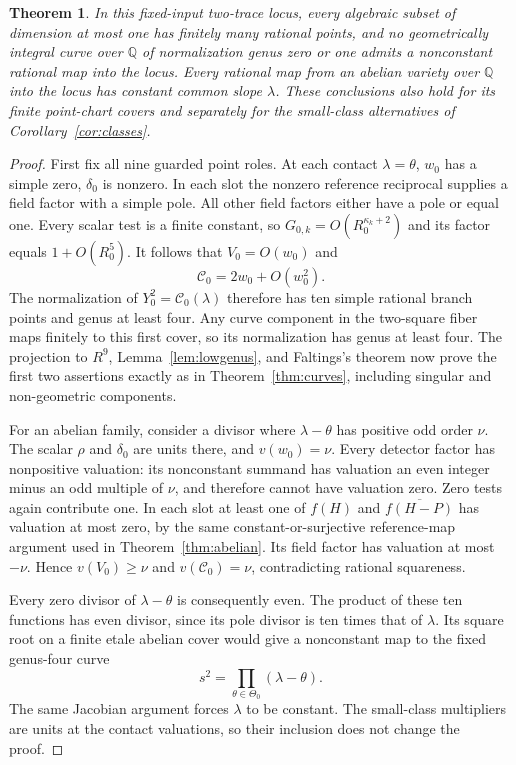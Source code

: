 \documentclass[11pt,a4paper]{article}
\newtheorem{theorem}{Theorem}[section]
\newcommand{\Q}{\mathbb Q}\newcommand{\Z}{\mathbb Z}
\begin{document}
\begin{theorem}\label{thm:general}
In this fixed-input two-trace locus, every algebraic subset of
dimension at most one has finitely many rational points, and no
geometrically integral curve over $\Q$ of normalization genus
zero or one admits a nonconstant rational map into the locus.
Every rational map from an abelian variety over $\Q$ into the
locus has constant common slope $\lambda$. These conclusions
also hold for its finite point-chart covers and separately for
the small-class alternatives of Corollary~\ref{cor:classes}.
\end{theorem}
\begin{proof}
First fix all nine guarded point roles. At each contact
$\lambda=\theta$, $w_0$ has a simple zero, $\delta_0$ is
nonzero. In each slot the nonzero reference reciprocal supplies a
field factor with a simple pole. All other field factors either
have a pole or equal one. Every scalar test is a finite constant, so
$G_{0,k}=O(R_0^{\kappa_k+2})$ and its factor equals
$1+O(R_0^5)$. It follows that $V_0=O(w_0)$ and
\[
                           \mathcal C_0=2w_0+O(w_0^2).
\]
The normalization of $Y_0^2=\mathcal C_0(\lambda)$ therefore
has ten simple rational branch points and genus at least four.
Any curve component in the two-square fiber maps finitely to
this first cover, so its normalization has genus at least four.
The projection to $R^9$, Lemma~\ref{lem:lowgenus}, and Faltings's
theorem now prove the first two assertions exactly as in
Theorem~\ref{thm:curves}, including singular and non-geometric
components.

For an abelian family, consider a divisor where
$\lambda-\theta$ has positive odd order $\nu$. The scalar
$\rho$ and $\delta_0$ are units there, and $v(w_0)=\nu$.
Every detector factor has nonpositive valuation: its nonconstant
summand has valuation an even integer minus an odd multiple of
$\nu$, and therefore cannot have valuation zero. Zero tests
again contribute one. In each slot at least one of $f(H)$ and
$\overline{f(H-P)}$ has valuation at most zero, by the same
constant-or-surjective reference-map argument used in
Theorem~\ref{thm:abelian}. Its field factor has valuation at
most $-\nu$. Hence $v(V_0)\ge\nu$ and
$v(\mathcal C_0)=\nu$, contradicting rational squareness.

Every zero divisor of $\lambda-\theta$ is consequently even.
The product of these ten functions has even divisor, since its
pole divisor is ten times that of $\lambda$. Its square root on
a finite etale abelian cover would give a nonconstant map to the
fixed genus-four curve
\[
                           s^2=\prod_{\theta\in\Theta_0}
                                            (\lambda-\theta).
\]
The same Jacobian argument forces $\lambda$ to be constant.
The small-class multipliers are units at the contact valuations,
so their inclusion does not change the proof.
\end{proof}
\end{document}
